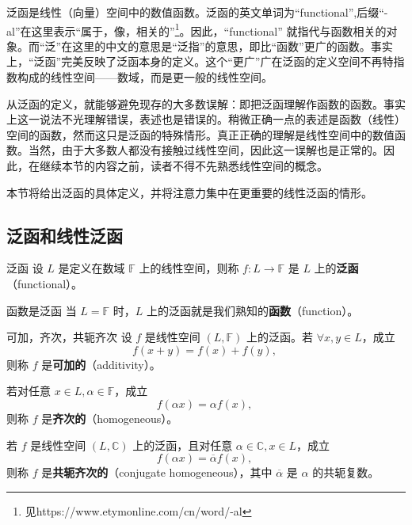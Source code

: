 
\cite{Ke1}泛函是线性（向量）空间中的数值函数。泛函的英文单词为“functional”,后缀“-al”在这里表示“属于，像，相关的”\footnote{见https://www.etymonline.com/cn/word/-al}。因此，“functional” 就指代与函数相关的对象。而“泛”在这里的中文的意思是“泛指”的意思，即比“函数”更广的函数。事实上，“泛函”完美反映了泛函本身的定义。这个“更广”广在泛函的定义空间不再特指数构成的线性空间——数域，而是更一般的线性空间。

从泛函的定义，就能够避免现存的大多数误解：即把泛函理解作函数的函数。事实上这一说法不光理解错误，表述也是错误的。稍微正确一点的表述是函数（线性）空间的函数，然而这只是泛函的特殊情形。真正正确的理解是线性空间中的数值函数。当然，由于大多数人都没有接触过线性空间，因此这一误解也是正常的。因此，在继续本节的内容之前，读者不得不先熟悉线性空间的概念。

本节将给出泛函的具体定义，并将注意力集中在更重要的线性泛函的情形。

\subsection{泛函和线性泛函}
\begin{definition}{泛函}
设 $L$ 是定义在数域 $\mathbb F$ 上的线性空间，则称 $f:L\rightarrow\mathbb F$ 是 $L$ 上的\textbf{泛函}（functional）。
\end{definition}

\begin{example}{函数是泛函}
当 $L=\mathbb F$ 时，$L$ 上的泛函就是我们熟知的\textbf{函数}（function）。
\end{example}

\begin{definition}{可加，齐次，共轭齐次}
设 $f$ 是线性空间 $(L,\mathbb F)$ 上的泛函。若 $\forall x,y\in L$，成立
\begin{equation}
f(x+y)=f(x)+f(y),~
\end{equation}
则称 $f$ 是\textbf{可加的}（additivity）。

若对任意 $x\in L,\alpha\in\mathbb F$，成立
\begin{equation}
f(\alpha x)=\alpha f(x),~
\end{equation}
则称 $f$ 是\textbf{齐次的}（homogeneous）。

若 $f$ 是线性空间 $(L,\mathbb C)$ 上的泛函，且对任意 $\alpha\in\mathbb C,x\in L$，成立
\begin{equation}
f(\alpha x)=\overline\alpha f(x),~
\end{equation}
则称 $f$ 是\textbf{共轭齐次的}（conjugate homogeneous），其中 $\overline\alpha$ 是 $\alpha$ 的共轭复数。
\end{definition}

